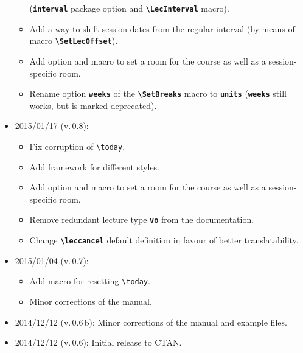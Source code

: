 \documentclass[english]{article}
\newcommand*\jmacro[1]{\textbf{\texttt{#1}}}
\newcommand*\jcsmacro[1]{\jmacro{\textbackslash{#1}}}
\newcommand*\joption[1]{\textbf{\texttt{#1}}}
\newcommand*\jfmacro[1]{\texttt{#1}}
\newcommand*\jfcsmacro[1]{\jfmacro{\textbackslash{#1}}}
\begin{document}
\begin{itemize}
\begin{itemize}
             (\joption{interval} package option and \jcsmacro{LecInterval} macro).
       \item Add a way to shift session dates from the regular interval
             (by means of macro \jcsmacro{SetLecOffset}).
       \item Add option and macro to set a room for the course as well as
             a session-specific room.
       \item Rename option \joption{weeks} of the \jcsmacro{SetBreaks} macro
             to \joption{units} (\joption{weeks} still works, but is marked deprecated).
    \end{itemize} 
\item 2015/01/17 (v.\,0.8):
    \begin{itemize}
       \item Fix corruption of \jfcsmacro{today}.
       \item Add framework for different styles.
       \item Add option and macro to set a room for the course as well as
             a session-specific room.
       \item Remove redundant lecture type \joption{vo} from the documentation.
       \item Change \jcsmacro{leccancel} default definition in favour of better
             translatability.
    \end{itemize}\filbreak
\item 2015/01/04 (v.\,0.7):
    \begin{itemize}
       \item Add macro for resetting \jfcsmacro{today}.
       \item Minor corrections of the manual.
    \end{itemize}
\item 2014/12/12 (v.\,0.6\,b): Minor corrections of the manual and example files.
\item 2014/12/12 (v.\,0.6): Initial release to CTAN.
\end{itemize}
\end{document}
